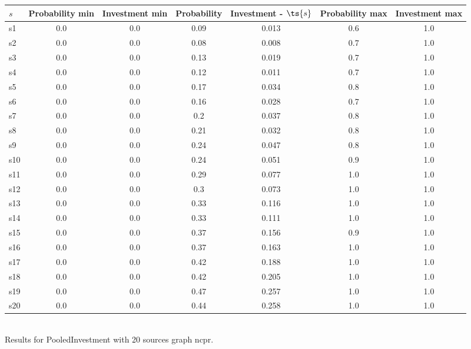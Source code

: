 \documentclass{article}
\begin{document}
\noindent\begin{tabular}{|l|c|c|c|c|c|c|}
\hline
$s$& Probability min & Investment min & Probability & Investment - $\ts{s}$ & Probability max & Investment max\\
\hline
s1 &0.0 & 0.0 & 0.09 & 0.013 & 0.6 & 1.0\\
\hline
s2 &0.0 & 0.0 & 0.08 & 0.008 & 0.7 & 1.0\\
\hline
s3 &0.0 & 0.0 & 0.13 & 0.019 & 0.7 & 1.0\\
\hline
s4 &0.0 & 0.0 & 0.12 & 0.011 & 0.7 & 1.0\\
\hline
s5 &0.0 & 0.0 & 0.17 & 0.034 & 0.8 & 1.0\\
\hline
s6 &0.0 & 0.0 & 0.16 & 0.028 & 0.7 & 1.0\\
\hline
s7 &0.0 & 0.0 & 0.2 & 0.037 & 0.8 & 1.0\\
\hline
s8 &0.0 & 0.0 & 0.21 & 0.032 & 0.8 & 1.0\\
\hline
s9 &0.0 & 0.0 & 0.24 & 0.047 & 0.8 & 1.0\\
\hline
s10 &0.0 & 0.0 & 0.24 & 0.051 & 0.9 & 1.0\\
\hline
s11 &0.0 & 0.0 & 0.29 & 0.077 & 1.0 & 1.0\\
\hline
s12 &0.0 & 0.0 & 0.3 & 0.073 & 1.0 & 1.0\\
\hline
s13 &0.0 & 0.0 & 0.33 & 0.116 & 1.0 & 1.0\\
\hline
s14 &0.0 & 0.0 & 0.33 & 0.111 & 1.0 & 1.0\\
\hline
s15 &0.0 & 0.0 & 0.37 & 0.156 & 0.9 & 1.0\\
\hline
s16 &0.0 & 0.0 & 0.37 & 0.163 & 1.0 & 1.0\\
\hline
s17 &0.0 & 0.0 & 0.42 & 0.188 & 1.0 & 1.0\\
\hline
s18 &0.0 & 0.0 & 0.42 & 0.205 & 1.0 & 1.0\\
\hline
s19 &0.0 & 0.0 & 0.47 & 0.257 & 1.0 & 1.0\\
\hline
s20 &0.0 & 0.0 & 0.44 & 0.258 & 1.0 & 1.0\\
\hline
\end{tabular}\\

\noindent Results for PooledInvestment with 20 sources graph ncpr.
\end{document}
